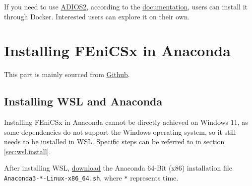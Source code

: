 \documentclass{report}
\begin{document}
If you need to use \href{https://github.com/ornladios/ADIOS2}{ADIOS2}, according to the \href{https://adios2.readthedocs.io/en/latest/setting_up/setting_up.html#docker}{documentation}, users can install it through Docker. Interested users can explore it on their own.

\chapter{Installing FEniCSx in Anaconda}

This part is mainly sourced from \href{https://github.com/FEniCS/dolfinx#conda}{Github}.

\section{Installing WSL and Anaconda}

Installing FEniCSx in Anaconda cannot be directly achieved on Windows 11, as some dependencies do not support the Windows operating system, so it still needs to be installed in WSL. Specific steps can be referred to in section \ref{sec:wsl.install}.

After installing WSL, \href{https://www.anaconda.com/products/distribution#Downloads}{download} the Anaconda 64-Bit (x86) installation file \texttt{Anaconda3-*-Linux-x86\_64.sh}, where \texttt{*} represents time.
\end{document}
